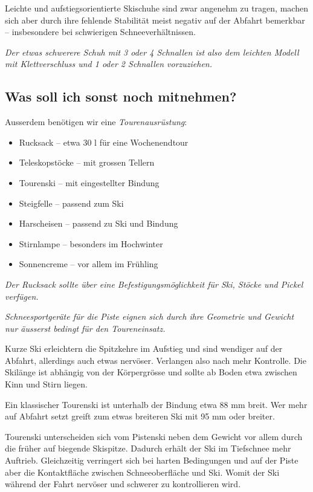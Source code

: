 Leichte und aufstiegsorientierte Skischuhe sind zwar angenehm zu tragen, machen sich aber durch ihre fehlende Stabilität meist negativ auf der Abfahrt bemerkbar -- insbesondere bei schwierigen Schneeverhältnissen.

\textit{Der etwas schwerere Schuh mit 3 oder 4 Schnallen ist also dem leichten Modell mit Klettverschluss und 1 oder 2 Schnallen vorzuziehen.}

\subsection{Was soll ich sonst noch mitnehmen?}

Ausserdem benötigen wir eine \textit{Tourenausrüstung}:

\begin{itemize}
  \item{Rucksack -- etwa 30 l für eine Wochenendtour}
  \item{Teleskopstöcke -- mit grossen Tellern}
  \item{Tourenski -- mit eingestellter Bindung}
  \item{Steigfelle -- passend zum Ski}
  \item{Harscheisen -- passend zu Ski und Bindung}
  \item{Stirnlampe -- besonders im Hochwinter}
  \item{Sonnencreme -- vor allem im Frühling}
\end{itemize}

\textit{Der Rucksack sollte über eine Befestigungsmöglichkeit für Ski, Stöcke und Pickel verfügen.}

\newcolumn

\textit{Schneesportgeräte für die Piste eignen sich durch ihre Geometrie und Gewicht nur äusserst bedingt für den Toureneinsatz.}

Kurze Ski erleichtern die Spitzkehre im Aufstieg und sind wendiger auf der Abfahrt, allerdings auch etwas nervöser.
Verlangen also nach mehr Kontrolle. Die Skilänge ist abhängig von der Körpergrösse und sollte ab Boden etwa zwischen Kinn und Stirn liegen.

Ein klassischer Tourenski ist unterhalb der Bindung etwa 88 mm breit.
Wer mehr auf Abfahrt setzt greift zum etwas breiteren Ski mit 95 mm oder breiter.

Tourenski unterscheiden sich vom Pistenski neben dem Gewicht vor allem durch die früher auf biegende Skispitze.
Dadurch erhält der Ski im Tiefschnee mehr Auftrieb.
Gleichzeitig verringert sich bei harten Bedingungen und auf der Piste aber die Kontaktfläche zwischen Schneeoberfläche und Ski.
Womit der Ski während der Fahrt nervöser und schwerer zu kontrollieren wird.

